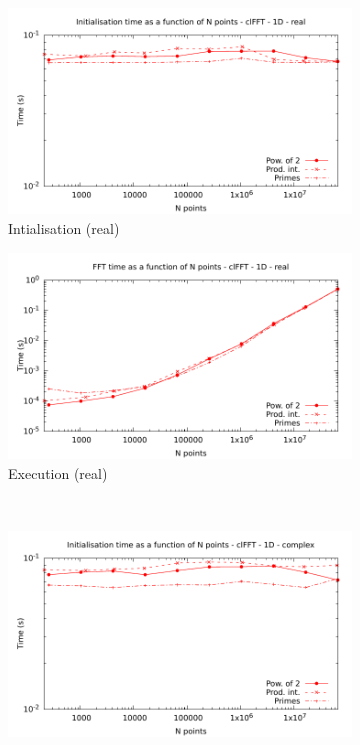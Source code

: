 \documentclass[12pt, a4paper]{article}
\begin{document}
\begin{figure}[H]
\captionsetup{width=0.8\linewidth}
\centering
\begin{subfigure}{.5\textwidth}
\centering
\includegraphics[width=.9\linewidth]{graphs/fft-opencl-1d-pow2-r-init.pdf}
\caption{Intialisation (real)}
\label{FFTCL1DRI}
\end{subfigure}%
\begin{subfigure}{.5\textwidth}
\centering
\includegraphics[width=.9\linewidth]{graphs/fft-opencl-1d-pow2-r-exec.pdf}
\caption{Execution (real)}
\label{FFTCL1DRE}
\end{subfigure}\\
\begin{subfigure}{.5\textwidth}
\centering
\includegraphics[width=.9\linewidth]{graphs/fft-opencl-1d-pow2-c-init.pdf}

\end{subfigure}
\end{figure}
\end{document}
